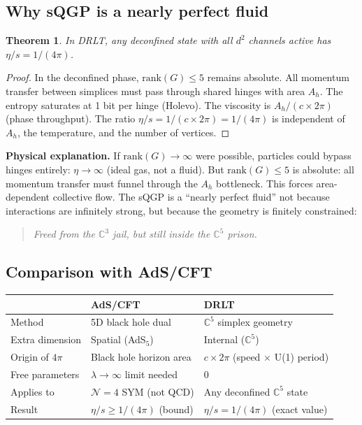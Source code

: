 \documentclass[12pt]{article}
\newtheorem{theorem}{Theorem}[section]
\theoremstyle{remark}
\theoremstyle{definition}
\newcommand{\CC}{\mathbb{C}}
\begin{document}
\subsection{Why sQGP is a nearly perfect fluid}

\begin{theorem}
In DRLT, any deconfined state with all $d^2$ channels active has $\eta/s = 1/(4\pi)$.
\end{theorem}

\begin{proof}
In the deconfined phase, $\text{rank}(G) \leq 5$ remains absolute. All momentum transfer between simplices must pass through shared hinges with area $A_h$. The entropy saturates at 1 bit per hinge (Holevo). The viscosity is $A_h/(c \times 2\pi)$ (phase throughput). The ratio $\eta/s = 1/(c \times 2\pi) = 1/(4\pi)$ is independent of $A_h$, the temperature, and the number of vertices.
\end{proof}

\textbf{Physical explanation.} If $\text{rank}(G) \to \infty$ were possible, particles could bypass hinges entirely: $\eta \to \infty$ (ideal gas, not a fluid). But $\text{rank}(G) \leq 5$ is absolute: all momentum transfer must funnel through the $A_h$ bottleneck. This forces area-dependent collective flow. The sQGP is a ``nearly perfect fluid'' not because interactions are infinitely strong, but because the geometry is finitely constrained:

\begin{quote}
\emph{Freed from the $\CC^3$ jail, but still inside the $\CC^5$ prison.}
\end{quote}

\subsection{Comparison with AdS/CFT}

\begin{center}
\begin{tabular}{lll}
\hline
& AdS/CFT & DRLT \\
\hline
Method & 5D black hole dual & $\CC^5$ simplex geometry \\
Extra dimension & Spatial (AdS$_5$) & Internal ($\CC^5$) \\
Origin of $4\pi$ & Black hole horizon area & $c \times 2\pi$ (speed $\times$ U(1) period) \\
Free parameters & $\lambda \to \infty$ limit needed & 0 \\
Applies to & $\mathcal{N}{=}4$ SYM (not QCD) & Any deconfined $\CC^5$ state \\
Result & $\eta/s \geq 1/(4\pi)$ (bound) & $\eta/s = 1/(4\pi)$ (exact value) \\
\hline
\end{tabular}
\end{center}
\end{document}
